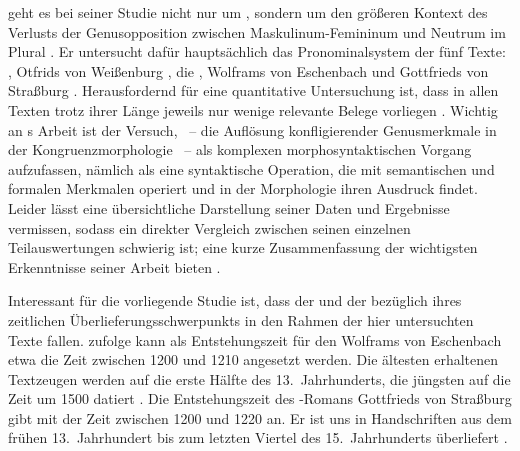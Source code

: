 \citet{askedal1973} geht es bei seiner Studie nicht nur um
, sondern um den größeren Kontext des Verlusts der
Genusopposition zwischen Maskulinum-Femininum und Neutrum im Plural
\autocite[169--177]{askedal1973}. Er untersucht dafür hauptsächlich das
Pronominalsystem der fünf Texte: , Otfrids von Weißenburg , die , Wolframs
von Eschenbach
 und Gottfrieds von Straßburg
. Herausfordernd für eine quantitative Untersuchung ist, dass in
allen Texten trotz ihrer Länge jeweils nur wenige relevante Belege vorliegen
\autocites[187]{askedal1973}[118]{fleischerschallert2011}. Wichtig an
\citeauthor{askedal1973}s Arbeit ist der Versuch, ~-- die Auflösung konfligierender
Genusmerkmale in der Kongruenz\-morphologie \autocites(siehe
){corbett1983}~-- als komplexen morphosyntaktischen
Vorgang aufzufassen, nämlich als eine syntaktische Operation, die mit
semantischen und formalen
Merkmalen operiert und in der Morphologie ihren
Ausdruck findet. Leider lässt \citet{askedal1973} eine übersichtliche
Darstellung seiner Daten und Ergebnisse vermissen, sodass ein direkter
Vergleich zwischen seinen einzelnen Teilauswertungen schwierig ist; eine kurze
Zusammenfassung der wichtigsten Erkenntnisse seiner Arbeit bieten
\citet[118--119]{fleischerschallert2011}.

Interessant für die vorliegende Studie ist, dass der  und der
 bezüglich ihres zeitlichen
Überlieferungsschwerpunkts in den Rahmen der hier
untersuchten Texte fallen. \citet[1378]{bumke1999} zufolge kann als
Entstehungszeit für den  Wolframs von Eschenbach etwa die Zeit
zwischen 1200 und 1210 angesetzt werden. Die ältesten erhaltenen Textzeugen
werden auf die erste Hälfte des 13.~Jahrhunderts, die jüngsten auf die Zeit um
1500 datiert
\autocites[1381]{bumke1999}[vgl.~auch][s.\,v.~\textit{Wolfram von Eschenbach:
}]{hsc}. Die Entstehungszeit des -Romans Gottfrieds
von Straßburg gibt \citet[155]{kuhn1982} mit der
Zeit zwischen 1200 und 1220 an. Er ist uns in Handschriften aus dem frühen
13.~Jahrhundert bis zum letzten Viertel des 15.~Jahrhunderts überliefert
\autocite[vgl.][s.\,v.~\textit{Gottfried von Straßburg: }]{hsc}.

